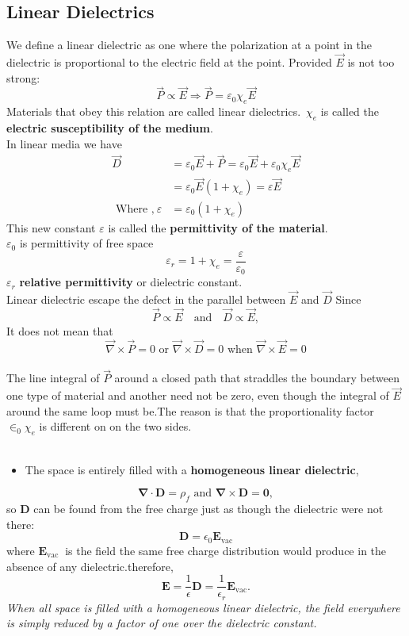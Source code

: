  \subsection{Linear Dielectrics}
 We define a linear dielectric as one where the polarization at a point in the dielectric  is proportional to the  electric field at the point. Provided ${\vec{E}}$ is not too strong: $$\vec{P} \propto \vec{E} \Rightarrow \vec{P}=\varepsilon_{0} \chi_{e} \vec{E}$$
 Materials that obey this relation are called linear dielectrics.\ $\chi_{e}$ is called the \textbf{electric susceptibility of the medium}.\\
 In linear media we have
 \begin{align*}
\vec{D}&=\varepsilon_{0} \vec{E}+\vec{P}=\varepsilon_{0} \vec{E}+\varepsilon_{0} \chi_{e} \vec{E}\\&=\varepsilon_{0} \vec{E}\left(1+\chi_{e}\right)=\varepsilon \vec{E} \\\text { Where ,}\  \varepsilon&=\varepsilon_{0}\left(1+\chi_{e}\right)
 \end{align*}
 This new constant $\varepsilon$ is called the \textbf{permittivity of the material}.\\
 $\varepsilon_{0}$ is permittivity of free space
 $$\varepsilon_r=1+\chi_{e}=\frac{\varepsilon}{\varepsilon_{0}}$$
 $\varepsilon_r$ \textbf{relative permittivity} or dielectric constant.\\
 Linear dielectric escape the defect in the parallel between $\vec{E}$ and $\vec{D}$ Since 
 $$ \vec{ P}\propto \vec{E} \quad\text{and}\quad\vec{ D}\propto \vec{E} ,$$
 It does not mean that 
 $$\vec{\nabla}\times \vec{P}=0 \text{ or }\vec{\nabla}\times \vec{ D}=0 \text{ when }\vec{ \nabla}\times \vec{E}=0$$\\
 The line integral of $\vec{P}$ around a closed path that straddles the boundary between one type of material and another need not be zero, even though the integral of $\vec{E}$ around the same loop must be.The reason is that the proportionality factor $\in_{0}\chi_{e}$ is different on on the two sides.\\\\
 \begin{itemize}
 	\item The space is entirely filled with a \textbf{homogeneous linear dielectric},
 \end{itemize}
$$\boldsymbol{\nabla} \cdot \mathbf{D}=\rho_{f}\text{ and }\boldsymbol{\nabla} \times \mathbf{D}=\mathbf{0},$$
so $\mathbf{D}$ can be found from the free charge just as though the dielectric were not there:
$$
\mathbf{D}=\epsilon_{0} \mathbf{E}_{\mathrm{vac}}
$$
where $\mathbf{E}_{\text {vac }}$ is the field the same free charge distribution would produce in the absence of any dielectric.therefore,
$$
\mathbf{E}=\frac{1}{\epsilon} \mathbf{D}=\frac{1}{\epsilon_{r}} \mathbf{E}_{\mathrm{vac}} .
$$
\textit{ When all space is filled with a homogeneous linear dielectric, the field everywhere is simply reduced by a factor of one over the dielectric constant.}
